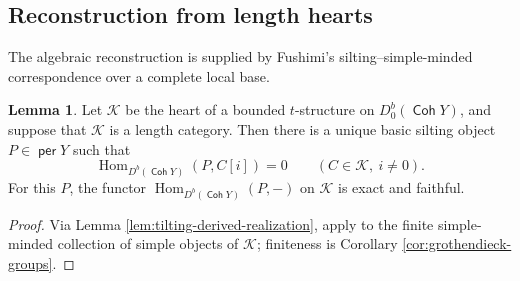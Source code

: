 \documentclass[a4paper,reqno]{amsart}
\def\K{\mathcal{K}}
\DeclareMathOperator{\Coh}{\mathsf{Coh}}
\DeclareMathOperator{\per}{\mathsf{per}}
\DeclareMathOperator{\Hom}{Hom}
\theoremstyle{definition}
\newtheorem{Lem}[Thm]{Lemma}
\begin{document}
\subsection{Reconstruction from length hearts}

The algebraic reconstruction is supplied by Fushimi's silting--simple-minded correspondence over a complete local base.

\begin{Lem}\label{lem:length-heart-duality}
Let $\K$ be the heart of a bounded $t$-structure on $D^b_0(\Coh Y)$, and suppose that $\K$ is a length category. Then there is a unique basic silting object $P\in\per Y$ such that
\begin{equation}\label{eq:dual-silting-object}
\Hom_{D^b(\Coh Y)}(P,C[i])=0
\qquad(C\in\K,\ i\ne0).
\end{equation}
For this $P$, the functor $\Hom_{D^b(\Coh Y)}(P,-)$ on $\K$ is exact and faithful.
\end{Lem}
\begin{proof}
Via Lemma \ref{lem:tilting-derived-realization}, apply \cite[Theorem 3.6 and Proposition 2.13(1)]{Fus26} to the finite simple-minded collection of simple objects of $\K$; finiteness is Corollary \ref{cor:grothendieck-groups}.
\end{proof}
\end{document}
